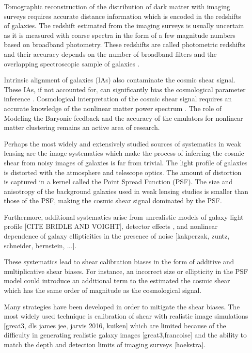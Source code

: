 Tomographic reconstruction of the distribution of dark matter with imaging surveys requires 
accurate distance information which is encoded in the redshifts of galaxies. 
The redshift estimated from the imaging surveys is usually uncertain as it is measured with coarse 
spectra in the form of a few magnitude numbers based on broadband photometry. These redshifts are called 
photometric redshifts and their accuracy depends on the number of broadband filters and the overlapping spectroscopic 
sample of galaxies \citep{bonnett2016,choi2016,boris2016,hildebrandt2017}. %

Intrinsic alignment of galaxies (IAs) also contaminate the cosmic shear signal. These IAs, if not accounted for, 
can significantly bias the cosmological parameter inference \citep{codis2015,joachimi2015, kirk2015,krause_ia}. 
Cosmological interpretation of the cosmic shear signal requires an accurate knowledge of the nonlinear 
matter power spectrum \citep{semboloni2013, eifler2015, schaye2015, joudaki2016, kitching2016, mead2016}. The role of 
Modeling the Baryonic feedback and the accuracy of the emulators for nonlinear matter clustering remains an active area of research. 

Perhaps the most widely and extensively studied sources of systematics in weak lensing are the image systematics which make 
the process of inferring the cosmic shear from noisy images of galaxies is far from trivial. The light profile of 
galaxies is distorted with the atmosphere and telescope optics. The amount of distortion is captured in a kernel called 
the Point Spread Function (PSF). The size and anisotropy of the background galaxies used in weak lensing studies is 
smaller than those of the PSF, making the cosmic shear signal dominated by the PSF.  

Furthermore, additional systematics arise from unrealistic models of galaxy light profile [CITE BRIDLE AND VOIGHT], 
detector effects \citep{arun2016,jaya2016,plazas2016}, and nonlinear dependence of galaxy ellipticities in the presence of noise 
[kakperzak, zuntz, schneider, bernstein, ...].

These systematics lead to shear calibration biases in the form of additive and multiplicative 
shear biases. For instance, an incorrect size or ellipticity in the PSF model could introduce 
an additional term to the estimated the cosmic shear which has the same order of magnitude as 
the cosmological signal.

Many strategies have been developed in order to mitigate the shear biases. 
The most widely used technique is calibration of shear with realistic image simulations [great3, dls james jee, jarvis 2016, kuiken] which 
are limited because of the difficulty in generating realistic galaxy images [great3,francoise] and the ability to match the depth and 
detection limits of imaging surveys [hoekstra]. 

